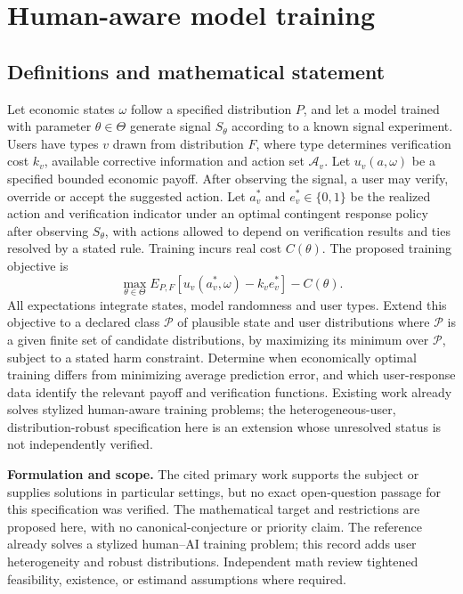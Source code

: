 \documentclass[11pt]{article}
\begin{document}
\section*{Human-aware model training}\label{30007700}
\subsection{Definitions and mathematical statement}
Let economic states \(\omega\) follow a specified distribution \(P\), and let a model trained with parameter \(\theta\in\Theta\) generate signal \(S_\theta\) according to a known signal experiment. Users have types \(v\) drawn from distribution \(F\), where type determines verification cost \(k_v\), available corrective information and action set \(\mathcal A_v\). Let \(u_v(a,\omega)\) be a specified bounded economic payoff. After observing the signal, a user may verify, override or accept the suggested action. Let \(a_v^\ast\) and \(e_v^\ast\in\{0,1\}\) be the realized action and verification indicator under an optimal contingent response policy after observing \(S_\theta\), with actions allowed to depend on verification results and ties resolved by a stated rule. Training incurs real cost \(C(\theta)\). The proposed training objective is
\[
\max_{\theta\in\Theta}E_{P,F}[u_v(a_v^\ast,\omega)-k_v e_v^\ast]-C(\theta).
\]
All expectations integrate states, model randomness and user types. Extend this objective to a declared class \(\mathcal P\) of plausible state and user distributions where \(\mathcal P\) is a given finite set of candidate distributions, by maximizing its minimum over \(\mathcal P\), subject to a stated harm constraint. Determine when economically optimal training differs from minimizing average prediction error, and which user-response data identify the relevant payoff and verification functions. Existing work already solves stylized human-aware training problems; the heterogeneous-user, distribution-robust specification here is an extension whose unresolved status is not independently verified.

\par\textbf{Formulation and scope.} The cited primary work supports the subject or supplies solutions in particular settings, but no exact open-question passage for this specification was verified. The mathematical target and restrictions are proposed here, with no canonical-conjecture or priority claim. The reference already solves a stylized human–AI training problem; this record adds user heterogeneity and robust distributions. Independent math review tightened feasibility, existence, or estimand assumptions where required.
\end{document}
